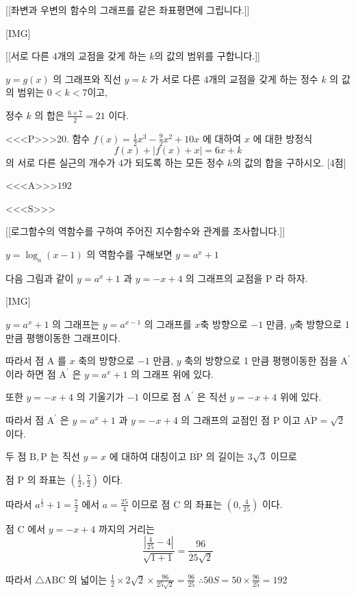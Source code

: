 \documentclass{oblivoir}
\begin{document}
[[좌변과 우변의 함수의 그래프를 같은 좌표평면에 그립니다.]]

[IMG]

[[서로 다른 $4$개의 교점을 갖게 하는 $k$의 값의 범위를 구합니다.]]

$y=g(x)$ 의 그래프와 직선 $y=k$ 가 서로 다른 $4$개의 교점을 갖게 하는 정수 $k$ 의 값의 범위는 $0<k<7$이고,

정수 $k$ 의 합은 $\frac{6 \times 7}{2}=21$ 이다.


<<<P>>>20. 함수 $f(x)=\frac{1}{2} x^{3}-\frac{9}{2} x^{2}+10 x$ 에 대하여 $x$ 에 대한 방정식
$$
f(x)+|f(x)+x|=6 x+k
$$
의 서로 다른 실근의 개수가 $4$가 되도록 하는 모든 정수 $k$의 값의 합을 구하시오. [4점]

<<<A>>>$192$

<<<S>>>

[[로그함수의 역함수를 구하여 주어진 지수함수와 관계를 조사합니다.]]

$y=\log _{a}(x-1)$ 의 역함수를 구해보면 $y=a^{x}+1$

다음 그림과 같이 $y=a^{x}+1$ 과 $y=-x+4$ 의 그래프의 교점을 $\mathrm{P}$ 라 하자.

[IMG]

$y=a^{x}+1$ 의 그래프는 $y=a^{x-1}$ 의 그래프를 $x$축 방향으로 $-1$ 만큼, $y$축 방향으로 1 만큼 평행이동한 그래프이다.

따라서 점 $\mathrm{A}$ 를 $x$ 축의 방향으로 $-1$ 만큼, $y$ 축의 방향으로 1 만큼 평행이동한 점을 $\mathrm{A}^{\prime}$ 이라 하면 점 $\mathrm{A}^{\prime}$ 은 $y=a^{x}+1$ 의 그래프 위에 있다.

또한 $y=-x+4$ 의 기울기가 $-1$ 이므로 점 $\mathrm{A}^{\prime}$ 은 직선 $y=-x+4$ 위에 있다.

따라서 점 $\mathrm{A}^{\prime}$ 은 $y=a^{x}+1$ 과 $y=-x+4$ 의 그래프의 교점인 점 $\mathrm{P}$ 이고 $\overline{\mathrm{AP}}=\sqrt{2}$ 이다.

두 점 $\mathrm{B}, \mathrm{P}$ 는 직선 $y=x$ 에 대하여 대칭이고 $\overline{\mathrm{BP}}$ 의 길이는 $3 \sqrt{3}$ 이므로

점 $\mathrm{P}$ 의 좌표는 $\left(\frac{1}{2}, \frac{7}{2}\right)$ 이다.

따라서 $a^{\frac{1}{2}}+1=\frac{7}{2}$ 에서 $a=\frac{25}{4}$ 이므로 점 $\mathrm{C}$ 의 좌표는 $\left(0, \frac{4}{25}\right)$ 이다.

점 $\mathrm{C}$ 에서 $y=-x+4$ 까지의 거리는
$$
\frac{\left|\frac{4}{25}-4\right|}{\sqrt{1+1}}=\frac{96}{25 \sqrt{2}}
$$

따라서 $\triangle \mathrm{ABC}$ 의 넓이는 $\frac{1}{2} \times 2 \sqrt{2} \times \frac{96}{25 \sqrt{2}}=\frac{96}{25}$ $\therefore 50 S=50 \times \frac{96}{25}=192$
\end{document}
